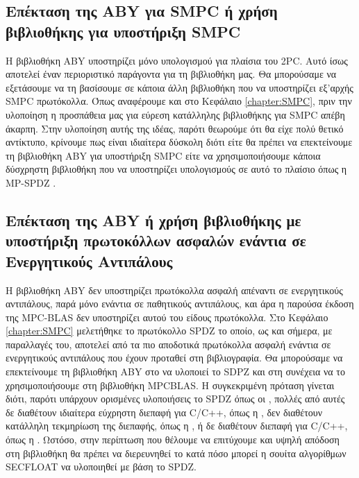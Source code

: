 \subsection{Επέκταση της ABY για SMPC ή χρήση βιβλιοθήκης για υποστήριξη SMPC}
Η βιβλιοθήκη ABY υποστηρίζει μόνο υπολογισμού για πλαίσια του 2PC. Αυτό ίσως αποτελεί έναν περιοριστικό παράγοντα για τη βιβλιοθήκη μας. Θα μπορούσαμε να εξετάσουμε να τη βασίσουμε σε κάποια άλλη βιβλιοθήκη που να υποστηρίζει εξ'αρχής SMPC πρωτόκολλα. Όπως αναφέρουμε και στο Κεφάλαιο \ref{chapter:SMPC}, πριν την υλοποίηση η προσπάθεια μας για εύρεση κατάλληλης βιβλιοθήκης για SMPC απέβη άκαρπη. Στην υλοποίηση αυτής της ιδέας, παρότι θεωρούμε ότι θα είχε πολύ θετικό αντίκτυπο, κρίνουμε πως είναι ιδιαίτερα δύσκολη διότι είτε θα πρέπει να επεκτείνουμε τη βιβλιοθήκη ABY για υποστήριξη SMPC είτε να χρησιμοποιήσουμε κάποια δύσχρηστη βιβλιοθήκη που να υποστηρίζει υπολογισμούς σε αυτό το πλαίσιο όπως η MP-SPDZ \cite{mp-spdz}.

\subsection{Επέκταση της ABY ή χρήση βιβλιοθήκης με υποστήριξη πρωτοκόλλων ασφαλών ενάντια σε Ενεργητικούς Αντιπάλους}
Η βιβλιοθήκη ABY δεν υποστηρίζει πρωτόκολλα ασφαλή απέναντι σε ενεργητικούς αντιπάλους, παρά μόνο ενάντια σε παθητικούς αντιπάλους, και άρα η παρούσα έκδοση της MPC-BLAS δεν υποστηρίζει αυτού του είδους πρωτόκολλα. Στο Κεφάλαιο \ref{chapter:SMPC} μελετήθηκε το πρωτόκολλο SPDZ το οποίο, ως και σήμερα, με παραλλαγές του, αποτελεί από τα πιο αποδοτικά πρωτόκολλα ασφαλή ενάντια σε ενεργητικούς αντιπάλους που έχουν προταθεί στη βιβλιογραφία. Θα μπορούσαμε να επεκτείνουμε τη βιβλιοθήκη ABY στο να υλοποιεί το SDPZ και στη συνέχεια να το χρησιμοποιήσουμε στη βιβλιοθήκη MPCBLAS. Η συγκεκριμένη πρόταση γίνεται διότι, παρότι υπάρχουν ορισμένες υλοποιήσεις το SPDZ όπως οι \cite{mp-spdz,aly2021scale,FRESCO}, πολλές από αυτές δε διαθέτουν ιδιαίτερα εύχρηστη διεπαφή για C/C++, όπως η \cite{aly2021scale}, δεν διαθέτουν κατάλληλη τεκμηρίωση της διεπαφής, όπως η \cite{mp-spdz}, ή δε διαθέτουν διεπαφή για C/C++, όπως η \cite{FRESCO}. Ωστόσο, στην περίπτωση που θέλουμε να επιτύχουμε και υψηλή απόδοση στη βιβλιοθήκη θα πρέπει να διερευνηθεί το κατά πόσο μπορεί η σουίτα αλγορίθμων SECFLOAT να υλοποιηθεί με βάση το SPDZ.